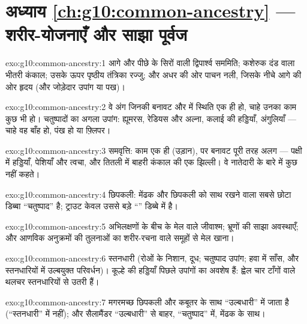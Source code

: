 \section*{अध्याय \ref{ch:g10:common-ancestry} --- शरीर-योजनाएँ और साझा पूर्वज}

\begin{solution}{exo:g10:common-ancestry:1}
आगे और पीछे के सिरों वाली द्विपार्श्व सममिति; कशेरुक दंड वाला भीतरी
कंकाल; उसके ऊपर पृष्ठीय तंत्रिका रज्जु; और अधर की ओर पाचन नली, जिसके
नीचे आगे की ओर हृदय (और जोड़ेदार उपांग या पख)।
\end{solution}

\begin{solution}{exo:g10:common-ancestry:2}
वे अंग जिनकी बनावट और  में स्थिति एक ही हो, चाहे उनका काम कुछ
भी हो। चतुष्पादों का अगला उपांग: ह्यूमरस, रेडियस और अल्ना, कलाई की
हड्डियाँ, अंगुलियाँ --- चाहे वह बाँह हो, पंख हो या फ़्लिपर।
\end{solution}

\begin{solution}{exo:g10:common-ancestry:3}
समवृत्ति: काम एक ही (उड़ान), पर बनावट पूरी तरह अलग --- पक्षी में
हड्डियाँ, पेशियाँ और त्वचा, और तितली में बाहरी कंकाल की एक झिल्ली। वे
नातेदारी के बारे में कुछ नहीं कहते।
\end{solution}

\begin{solution}{exo:g10:common-ancestry:4}
छिपकली: मेंढक और छिपकली को साथ रखने वाला सबसे छोटा डिब्बा ``चतुष्पाद''
है; ट्राउट केवल उससे बड़े ``'' डिब्बे में है।
\end{solution}

\begin{solution}{exo:g10:common-ancestry:5}
अभिलक्षणों के बीच के मेल वाले जीवाश्म;  भ्रूणों की साझा
अवस्थाएँ; और आणविक अनुक्रमों की तुलनाओं का शरीर-रचना वाले समूहों से मेल
खाना।
\end{solution}

\begin{solution}{exo:g10:common-ancestry:6}
स्तनधारी (रोओं के निशान, दूध; चतुष्पाद उपांग; हवा में साँस, और
स्तनधारियों में उल्बयुक्त परिवर्धन)। कूल्हे की हड्डियाँ पिछले उपांगों का
अवशेष हैं: ह्वेल चार टाँगों वाले थलचर स्तनधारियों से उतरी हैं।
\end{solution}

\begin{solution}{exo:g10:common-ancestry:7}
मगरमच्छ छिपकली और कबूतर के साथ ``उल्बधारी'' में जाता है (``स्तनधारी'' में
नहीं); और सैलामैंडर ``उल्बधारी'' से बाहर, ``चतुष्पाद'' में, मेंढक के साथ।
\end{solution}

